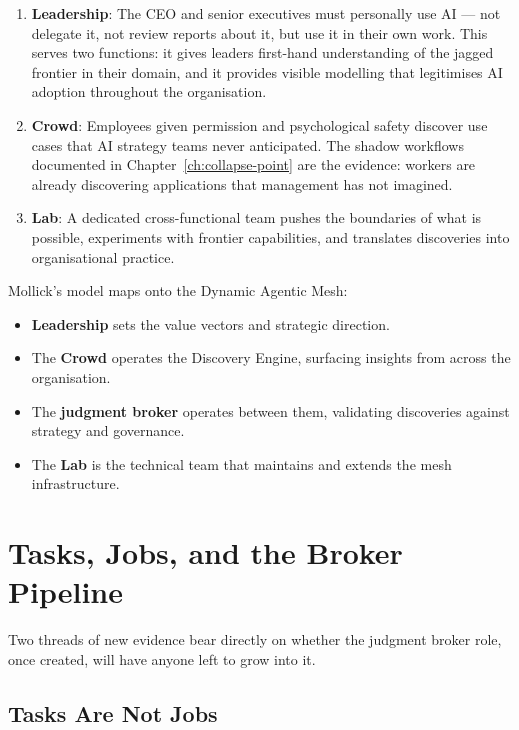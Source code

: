 \begin{enumerate}
  \item \textbf{Leadership}: The CEO and senior executives must personally use AI --- not delegate it, not review reports about it, but use it in their own work. This serves two functions: it gives leaders first-hand understanding of the jagged frontier in their domain, and it provides visible modelling that legitimises AI adoption throughout the organisation.
  \item \textbf{Crowd}: Employees given permission and psychological safety discover use cases that AI strategy teams never anticipated. The shadow workflows documented in Chapter~\ref{ch:collapse-point} are the evidence: workers are already discovering applications that management has not imagined.
  \item \textbf{Lab}: A dedicated cross-functional team pushes the boundaries of what is possible, experiments with frontier capabilities, and translates discoveries into organisational practice.
\end{enumerate}

\begin{keyinsight}
Mollick's model maps onto the Dynamic Agentic Mesh:
\begin{itemize}
  \item \textbf{Leadership} sets the value vectors and strategic direction.
  \item The \textbf{Crowd} operates the Discovery Engine, surfacing insights from across the organisation.
  \item The \textbf{judgment broker} operates between them, validating discoveries against strategy and governance.
  \item The \textbf{Lab} is the technical team that maintains and extends the mesh infrastructure.
\end{itemize}
\end{keyinsight}

\section{Tasks, Jobs, and the Broker Pipeline}

Two threads of new evidence bear directly on whether the judgment broker role, once created, will have anyone left to grow into it.

\subsection{Tasks Are Not Jobs}

